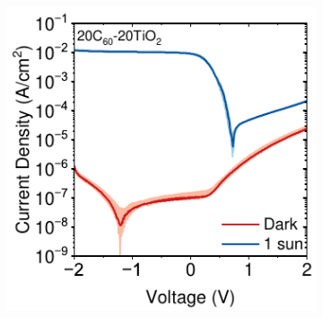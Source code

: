 \begin{figure}[ht!]
\begin{subfigure}[b]{0.32\textwidth}
        \caption{}
    \end{subfigure}
    \hfill
    \begin{subfigure}[b]{0.32\textwidth}
        \centering
        \includegraphics[width=\textwidth]{chapters/transport_layers/images/JV_Median_20_20.pdf}
        \caption{}
    \end{subfigure}



\end{figure}
